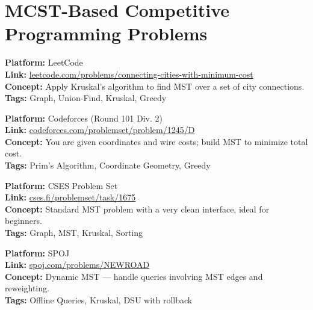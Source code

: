 \documentclass[a4paper,14pt]{extarticle}
\begin{document}
\section{MCST-Based Competitive Programming Problems}


\begin{tcolorbox}[title=1. \textbf{Connecting Cities With Minimum Cost}]
\textbf{Platform:} LeetCode \\
\textbf{Link:} \href{https://leetcode.com/problems/connecting-cities-with-minimum-cost/}{leetcode.com/problems/connecting-cities-with-minimum-cost} \\
\textbf{Concept:} Apply Kruskal’s algorithm to find MST over a set of city connections. \\
\textbf{Tags:} Graph, Union-Find, Kruskal, Greedy
\end{tcolorbox}

\begin{tcolorbox}[title=2. \textbf{Planet Connections}]
\textbf{Platform:} Codeforces (Round 101 Div. 2) \\
\textbf{Link:} \href{https://codeforces.com/problemset/problem/1245/D}{codeforces.com/problemset/problem/1245/D} \\
\textbf{Concept:} You are given coordinates and wire costs; build MST to minimize total cost. \\
\textbf{Tags:} Prim’s Algorithm, Coordinate Geometry, Greedy
\end{tcolorbox}

\begin{tcolorbox}[title=3. \textbf{Fiber Network}]
\textbf{Platform:} CSES Problem Set \\
\textbf{Link:} \href{https://cses.fi/problemset/task/1675}{cses.fi/problemset/task/1675} \\
\textbf{Concept:} Standard MST problem with a very clean interface, ideal for beginners. \\
\textbf{Tags:} Graph, MST, Kruskal, Sorting
\end{tcolorbox}

\begin{tcolorbox}[title=4. \textbf{New Roads Queries}]
\textbf{Platform:} SPOJ \\
\textbf{Link:} \href{https://www.spoj.com/problems/NEWROAD/}{spoj.com/problems/NEWROAD} \\
\textbf{Concept:} Dynamic MST — handle queries involving MST edges and reweighting. \\
\textbf{Tags:} Offline Queries, Kruskal, DSU with rollback
\end{tcolorbox}
\end{document}
